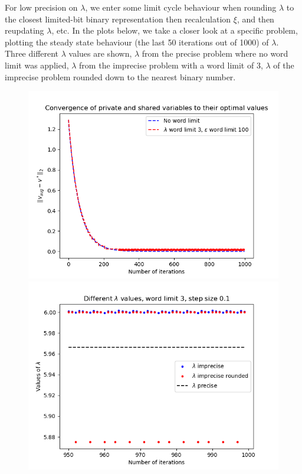\documentclass[12pt]{article}
\begin{document}
For low precision on $\lambda$, we enter some limit cycle behaviour when rounding $\lambda$ to the closest limited-bit binary representation then recalculation $\xi$, and then reupdating $\lambda$, etc. In the plots below, we take a closer look at a specific problem, plotting the steady state behaviour (the last 50 iterations out of 1000) of $\lambda$. Three different $\lambda$ values are shown, $\lambda$ from the precise problem where no word limit was applied, $\lambda$ from the imprecise problem with a word limit of 3, $\lambda$ of the imprecise problem rounded down to the nearest binary number.

\begin{figure}[H]
	\centering
	\includegraphics[scale=0.5]{Problem4-lambda1.png}
	\includegraphics[scale=0.5]{Problem4-lambda2.png}

\end{figure}
\end{document}
